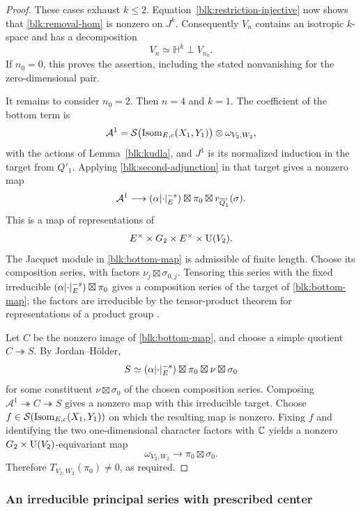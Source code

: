 \begin{proof}
These cases exhaust $k\le2$.  Equation~\eqref{blk:restriction-injective}
now shows that \eqref{blk:removal-hom} is nonzero on $J^k$.  Consequently
$V_n$ contains an isotropic $k$-space and has a decomposition
\[
 V_n\simeq\mathbb H^k\perp V_{n_0}.
\]
If $n_0=0$, this proves the assertion, including the stated nonvanishing
for the zero-dimensional pair.

It remains to consider $n_0=2$.  Then $n=4$ and $k=1$.  The coefficient
of the bottom term is
\[
 \mathcal A^1=
 \mathcal S\bigl(\operatorname{Isom}_{E,c}(X_1,Y_1)\bigr)
       \otimes\omega_{V_2,W_2},
\]
with the actions of Lemma~\ref{blk:kudla}, and $J^1$ is its normalized
induction in the target from $Q'_1$.  Applying
\eqref{blk:second-adjunction} in that target gives a nonzero map
\begin{equation}
 \mathcal A^1\longrightarrow
   (\alpha\lvert\cdot\rvert_E^{-s})\boxtimes\pi_0
                   \boxtimes r_{\overline Q'_1}(\sigma).
 \label{blk:bottom-map}
\end{equation}
This is a map of representations of
\[
 E^\times\times G_2\times E^\times\times\operatorname{U}(V_2).
\]
The Jacquet module in \eqref{blk:bottom-map} is admissible of finite
length.  Choose its composition series, with factors
$\nu_j\boxtimes\sigma_{0,j}$.  Tensoring this series with the fixed
irreducible $(\alpha\lvert\cdot\rvert_E^{-s})\boxtimes\pi_0$ gives a
composition series of the target of \eqref{blk:bottom-map}; the factors
are irreducible by the tensor-product theorem for representations of a
product group \cite[\S1.6]{BZ77}.

Let $C$ be the nonzero image of \eqref{blk:bottom-map}, and choose a
simple quotient $C\twoheadrightarrow S$.  By Jordan--H\"older,
\[
 S\simeq
 (\alpha\lvert\cdot\rvert_E^{-s})\boxtimes\pi_0
                      \boxtimes\nu\boxtimes\sigma_0
\]
for some constituent $\nu\boxtimes\sigma_0$ of the chosen composition series.  Composing
$\mathcal A^1\twoheadrightarrow C\twoheadrightarrow S$ gives a
nonzero map with this irreducible target.  Choose
$f\in\mathcal S(\operatorname{Isom}_{E,c}(X_1,Y_1))$ on which the resulting map is
nonzero.  Fixing $f$ and identifying the two one-dimensional character
factors with $\mathbb C$ yields a nonzero
$G_2\times\operatorname{U}(V_2)$-equivariant map
\[
 \omega_{V_2,W_2}\longrightarrow\pi_0\boxtimes\sigma_0.
\]
Therefore $T_{V_2,W_2}(\pi_0)\ne0$, as required.
\end{proof}

\subsubsection{An irreducible principal series with prescribed center}

